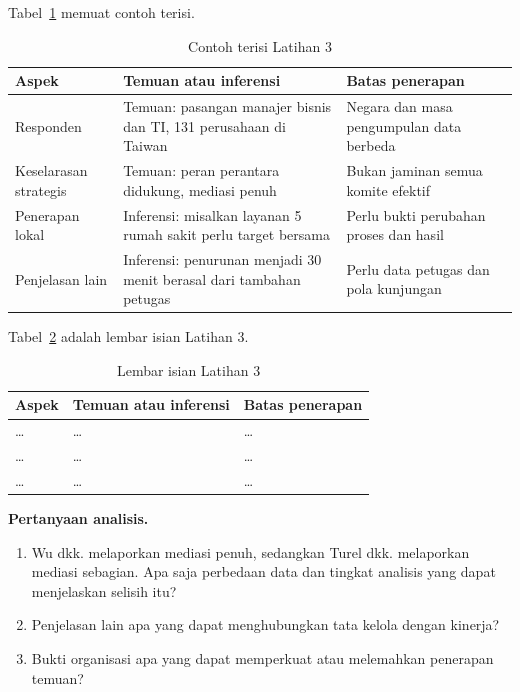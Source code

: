 Tabel~\ref{tab:ch02-lat3-contoh} memuat contoh terisi.
\begin{table}[!htb]
  \centering\small
  \caption{Contoh terisi Latihan 3}\label{tab:ch02-lat3-contoh}
  \begin{tabularx}{\textwidth}{|>{\raggedright\arraybackslash}p{}|>{\raggedright\arraybackslash}X|>{\raggedright\arraybackslash}X|}
    \hline
    \textbf{Aspek} & \textbf{Temuan atau inferensi} & \textbf{Batas penerapan} \\ \hline
    Responden & Temuan: pasangan manajer bisnis dan TI, 131 perusahaan di Taiwan & Negara dan masa
    pengumpulan data berbeda \\ \hline
    Keselarasan strategis & Temuan: peran perantara didukung, mediasi penuh & Bukan jaminan semua komite
    efektif \\ \hline
    Penerapan lokal & Inferensi: misalkan layanan 5 rumah sakit perlu target bersama & Perlu bukti perubahan
    proses dan hasil \\ \hline
    Penjelasan lain & Inferensi: penurunan menjadi 30 menit berasal dari tambahan petugas & Perlu data petugas
    dan pola kunjungan \\ \hline
  \end{tabularx}
\end{table}

Tabel~\ref{tab:ch02-lat3-hasil} adalah lembar isian Latihan 3.
\begin{table}[!htb]
  \centering\small
  \caption{Lembar isian Latihan 3}\label{tab:ch02-lat3-hasil}
  \begin{tabularx}{\textwidth}{|>{\raggedright\arraybackslash}p{}|>{\raggedright\arraybackslash}X|>{\raggedright\arraybackslash}X|}
    \hline
    \textbf{Aspek} & \textbf{Temuan atau inferensi} & \textbf{Batas penerapan} \\ \hline
    \dots & \dots & \dots \\ \hline
    \dots & \dots & \dots \\ \hline
    \dots & \dots & \dots \\ \hline
  \end{tabularx}
\end{table}

\textbf{Pertanyaan analisis.}
\begin{enumerate}
  \item Wu dkk. melaporkan mediasi penuh, sedangkan Turel dkk. melaporkan mediasi sebagian. Apa saja perbedaan
  data dan tingkat analisis yang dapat menjelaskan selisih itu?
  \item Penjelasan lain apa yang dapat menghubungkan tata kelola dengan kinerja?
  \item Bukti organisasi apa yang dapat memperkuat atau melemahkan penerapan temuan?
\end{enumerate}
